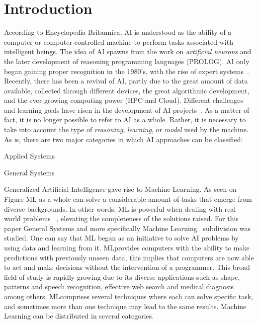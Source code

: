 
\section{Introduction}
\label{sec:introduction}

According to Encyclopedia Britannica, \ac{AI} is understood as the ability of a computer or 
computer-controlled machine to perform tasks associated with intelligent beings. The idea of 
\ac{AI} spawns from the work on \textit{artificial neurons} and the later development of reasoning 
programming languages (\eg PROLOG). \ac{AI} only began gaining proper recognition in the 
1980's, with the rise of expert systems~\cite{russel09}.  Recently, there has been a revival of 
\ac{AI}, partly due to the great amount of data available, collected through different devices, the 
great algorithmic development, and the ever growing computing power (\ie \ac{HPC} and Cloud). 
Different challenges and learning goals have risen in the development of \ac{AI} 
projects~\cite{russel09}. As a matter of fact, it is no longer possible to refer to \ac{AI} as a whole. 
Rather, it is necessary to take into account the type of \emph{reasoning}, \emph{learning}, or \emph{model} used by the machine. As is, there are two major categories in which \ac{AI} approaches can be classified:
\begin{enumerate*}[label=(\arabic*)]
\item Applied Systems
\item General Systems
\end{enumerate*}

Generalized Artificial Intelligence gave rise to Machine Learning. As seen on Figure  \ac{ML} as a whole can solve a considerable amount of tasks that emerge from diverse backgrounds. In other words, \ac{ML} is powerful when dealing with real world problems~\cite{michalski13} , elevating the completeness of the solutions raised. For this paper General Systems and more specifically Machine Learning~\cite{watkins92} subdivision was studied. One can say that \ac{ML} began as an initiative to solve AI problems by using data and learning from it. \ac{ML}provides computers with the ability to make predictions with previously unseen data, this implies that computers are now able to act and make decisions without the intervention of a programmer. This broad field of study is rapidly growing due to its diverse applications such as shape, patterns and speech recognition, effective web search and medical diagnosis among others. \ac{ML}comprises several techniques where each can solve specific task, and sometimes more than one technique may lead to the same results. Machine Learning can be distributed in several categories.

